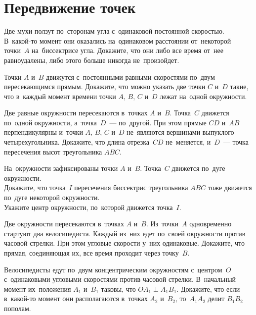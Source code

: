 
\section*{Передвижение точек}


\begin{problems}

\item
Две мухи ползут по~сторонам угла с~одинаковой постоянной скоростью.
В~какой-то момент они оказались на~одинаковом расстоянии от~некоторой точки~$A$
на~биссектрисе угла.
Докажите, что они либо все время от~нее равноудалены, либо этого больше никогда
не~произойдет.

\item
Точки $A$ и~$B$ движутся с~постоянными равными скоростями по~двум
пересекающимся прямым.
Докажите, что можно указать две точки $C$ и~$D$ такие, что в~каждый момент
времени точки $A$, $B$, $C$ и~$D$ лежат на~одной окружности.

\item
Две равные окружности пересекаются в~точках $A$ и~$B$.
Точка~$C$ движется по~одной окружности, а~точка~$D$~--- по~другой.
При этом прямые $CD$ и~$AB$ перпендикулярны и~точки $A$, $B$, $C$ и~$D$
не~являются вершинами выпуклого четырехугольника.
Докажите, что длина отрезка~$CD$ не~меняется, и~$D$~--- точка пересечения высот
треугольника $ABC$.

\item
На~окружности зафиксированы точки $A$ и~$B$.
Точка~$C$ движется по~дуге окружности.
\\
\subproblem
Докажите, что точка~$I$ пересечения биссектрис треугольника $ABC$ тоже движется
по~дуге некоторой окружности.
\\
\subproblem
Укажите центр окружности, по~которой движется точка~$I$.

\item
Две окружности пересекаются в~точках $A$ и~$B$.
Из~точки~$A$ одновременно стартуют два велосипедиста.
Каждый из~них едет по~своей окружности против часовой стрелки.
При этом угловые скорости у~них одинаковые.
Докажите, что прямая, соединяющая их, все время проходит через точку~$B$.

\item
Велосипедисты едут по~двум концентрическим окружностям с~центром~$O$
с~одинаковыми угловыми скоростями против часовой стрелки.
В~начальный момент их~положения $A_1$  и~$B_1$ таковы, что
$O A_1 \perp A_1 B_1$.
Докажите, что если в~какой-то момент они располагаются в~точках $A_2$ и~$B_2$,
то~$A_1 A_2$ делит $B_1 B_2$ пополам.


\end{problems}
